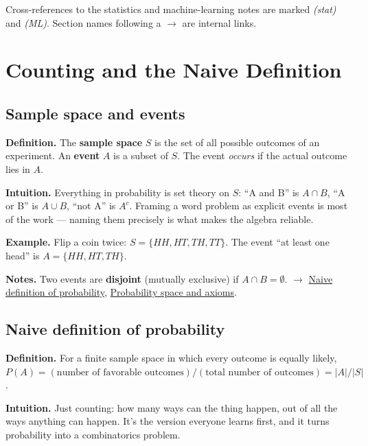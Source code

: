 \documentclass[11pt,a4paper]{article}
\begin{document}
\vspace{1em}
\normalsize
Cross-references to the statistics and machine-learning notes are marked \textit{(stat)} and
\textit{(ML)}. Section names following a $\to$ are internal links.



\section{Counting and the Naive Definition}

\subsection{Sample space and events}\label{sec:sample-space-and-events}

\textbf{Definition.} The \textbf{sample space} $S$ is the set of all possible outcomes of an experiment. An \textbf{event} $A$ is a subset of $S$. The event \textit{occurs} if the actual outcome lies in $A$.

\textbf{Intuition.} Everything in probability is set theory on $S$: ``A and B'' is $A \cap  B$, ``A or B'' is $A \cup  B$, ``not A'' is $A^{c}$. Framing a word problem as explicit events is most of the work --- naming them precisely is what makes the algebra reliable.

\textbf{Example.} Flip a coin twice: $S = \{HH, HT, TH, TT\}$. The event ``at least one head'' is $A = \{HH, HT, TH\}$.

\textbf{Notes.} Two events are \textbf{disjoint} (mutually exclusive) if $A \cap  B = \emptyset$. $\to$ \hyperref[sec:naive-definition-of-probability]{Naive definition of probability}, \hyperref[sec:probability-space-and-axioms]{Probability space and axioms}.

\subsection{Naive definition of probability}\label{sec:naive-definition-of-probability}

\textbf{Definition.} For a finite sample space in which every outcome is equally likely, $P(A) = (\text{number of favorable outcomes}) / (\text{total number of outcomes}) = |A| / |S|$.

\textbf{Intuition.} Just counting: how many ways can the thing happen, out of all the ways anything can happen. It's the version everyone learns first, and it turns probability into a combinatorics problem.
\end{document}
